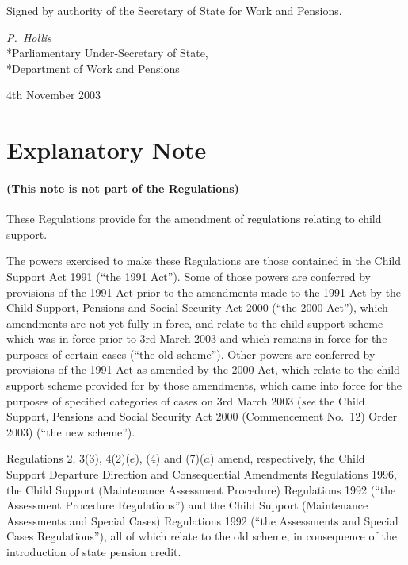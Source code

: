 \documentclass[12pt,a4paper]{article}
\begin{document}
\bigskip

Signed 
by authority of the Secretary of State for Work and Pensions.

{\raggedleft
\emph{P.~Hollis}\\*Parliamentary Under-Secretary of State,\\*Department of Work and Pensions

}


4th November 2003

\small

\part{Explanatory Note}

\renewcommand\parthead{— Explanatory Note}

\subsection*{(This note is not part of the Regulations)}

These Regulations provide for the amendment of regulations relating to child support.

The powers exercised to make these Regulations are those contained in the Child Support Act 1991 (“the 1991 Act”). Some of those powers are conferred by provisions of the 1991 Act prior to the amendments made to the 1991 Act by the Child Support, Pensions and Social Security Act 2000 (“the 2000 Act”), which amendments are not yet fully in force, and relate to the child support scheme which was in force prior to 3rd March 2003 and which remains in force for the purposes of certain cases (“the old scheme”). Other powers are conferred by provisions of the 1991 Act as amended by the 2000 Act, which relate to the child support scheme provided for by those amendments, which came into force for the purposes of specified categories of cases on 3rd March 2003 (\emph{see} the Child Support, Pensions and Social Security Act 2000 (Commencement No.\ 12) Order 2003) (“the new scheme”).

Regulations 2, 3(3), 4(2)($e$), (4) and (7)($a$)  amend, respectively, the Child Support Departure Direction and Consequential Amendments Regulations 1996, the Child Support (Maintenance Assessment Procedure) Regulations 1992 (“the Assessment Procedure Regulations”) and the Child Support (Maintenance Assessments and Special Cases) Regulations 1992 (“the Assessments and Special Cases Regulations”), all of which relate to the old scheme, in consequence of the introduction of state pension credit.
\end{document}

